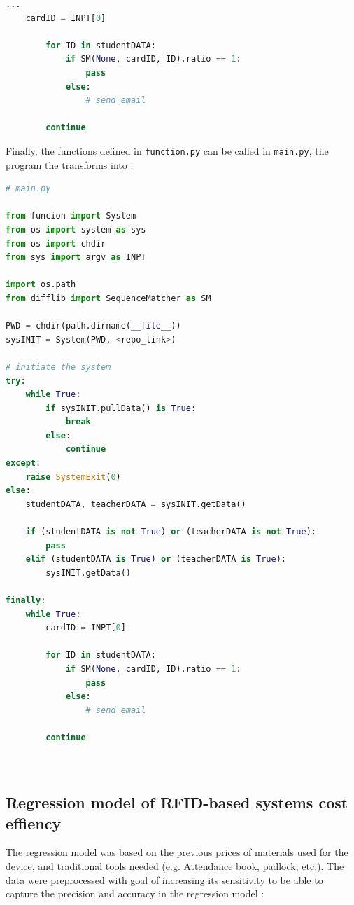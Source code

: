 \documentclass{article}
\begin{document}
\begin{center}
    \begin{lstlisting}[language=Python]
...
    cardID = INPT[0]
        
        for ID in studentDATA:
            if SM(None, cardID, ID).ratio == 1:
                pass
            else:
                # send email

        continue     
    \end{lstlisting}
\end{center}

Finally, the functions defined in \texttt{function.py} can be called in \texttt{main.py}, the program the transforms into :

\begin{center}
    \begin{lstlisting}[language=Python]
# main.py

from funcion import System 
from os import system as sys
from os import chdir
from sys import argv as INPT 

import os.path
from difflib import SequenceMatcher as SM

PWD = chdir(path.dirname(__file__))
sysINIT = System(PWD, <repo_link>)

# initiate the system
try:
    while True:
        if sysINIT.pullData() is True:
            break
        else:
            continue    
except:
    raise SystemExit(0) 
else:
    studentDATA, teacherDATA = sysINIT.getData()
    
    if (studentDATA is not True) or (teacherDATA is not True):
        pass
    elif (studentDATA is True) or (teacherDATA is True):
        sysINIT.getData()

finally:
    while True:
        cardID = INPT[0]
        
        for ID in studentDATA:
            if SM(None, cardID, ID).ratio == 1:
                pass
            else:
                # send email

        continue

                        
    \end{lstlisting}     
\end{center}




\subsection*{Regression model of RFID-based systems cost effiency}

The regression model was based on the previous prices of materials used for the device, and traditional tools needed (e.g. Attendance book, padlock, etc.). The data were preprocessed with goal of increasing its sensitivity to be able to capture the precision and accuracy in the regression model :
\end{document}
